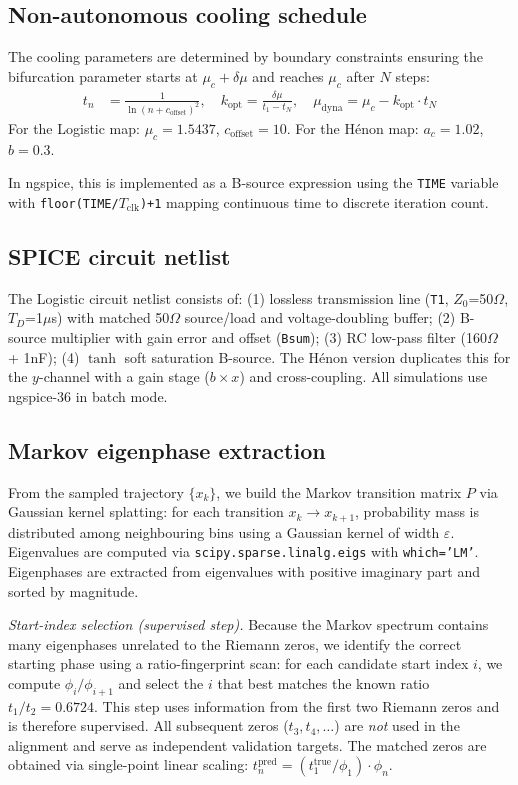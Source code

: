 \documentclass[11pt]{article}
\begin{document}
\subsection*{Non-autonomous cooling schedule}

The cooling parameters are determined by boundary constraints ensuring the bifurcation parameter starts at $\mu_c + \delta\mu$ and reaches $\mu_c$ after $N$ steps:
\begin{align}
t_n &= \frac{1}{\ln(n + c_{\text{offset}})^2}, \quad
k_{\text{opt}} = \frac{\delta\mu}{t_1 - t_N}, \quad
\mu_{\text{dyna}} = \mu_c - k_{\text{opt}} \cdot t_N
\end{align}
For the Logistic map: $\mu_c = 1.5437$, $c_{\text{offset}} = 10$. For the H\'enon map: $a_c = 1.02$, $b = 0.3$.

In ngspice, this is implemented as a B-source expression using the \texttt{TIME} variable with \texttt{floor(TIME/$T_{\text{clk}}$)+1} mapping continuous time to discrete iteration count.

\subsection*{SPICE circuit netlist}

The Logistic circuit netlist consists of: (1) lossless transmission line (\texttt{T1}, $Z_0$=50$\Omega$, $T_D$=1$\mu$s) with matched 50$\Omega$ source/load and voltage-doubling buffer; (2) B-source multiplier with gain error and offset (\texttt{Bsum}); (3) RC low-pass filter (160$\Omega$ + 1nF); (4) $\tanh$ soft saturation B-source. The H\'enon version duplicates this for the $y$-channel with a gain stage ($b \times x$) and cross-coupling. All simulations use ngspice-36 in batch mode.

\subsection*{Markov eigenphase extraction}

From the sampled trajectory $\{x_k\}$, we build the Markov transition matrix $P$ via Gaussian kernel splatting: for each transition $x_k \to x_{k+1}$, probability mass is distributed among neighbouring bins using a Gaussian kernel of width $\varepsilon$. Eigenvalues are computed via \texttt{scipy.sparse.linalg.eigs} with \texttt{which='LM'}. Eigenphases are extracted from eigenvalues with positive imaginary part and sorted by magnitude.

\emph{Start-index selection (supervised step).} Because the Markov spectrum contains many eigenphases unrelated to the Riemann zeros, we identify the correct starting phase using a ratio-fingerprint scan: for each candidate start index $i$, we compute $\phi_i/\phi_{i+1}$ and select the $i$ that best matches the known ratio $t_1/t_2 = 0.6724$. This step uses information from the first two Riemann zeros and is therefore supervised. All subsequent zeros ($t_3, t_4, \ldots$) are \emph{not} used in the alignment and serve as independent validation targets. The matched zeros are obtained via single-point linear scaling: $t_n^{\text{pred}} = (t_1^{\text{true}}/\phi_1) \cdot \phi_n$.
\end{document}
